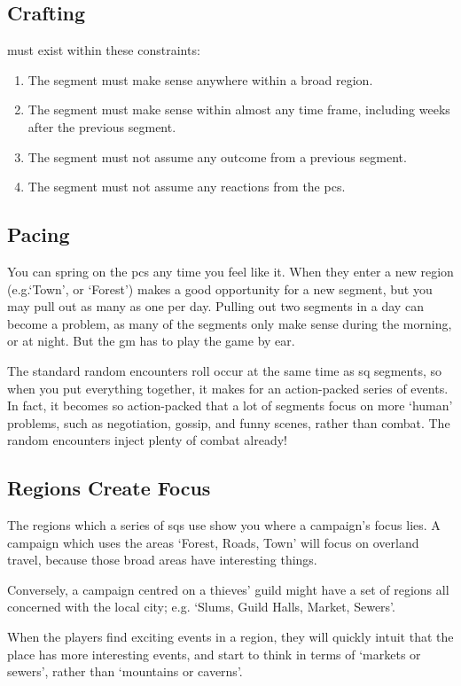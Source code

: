 \begin{multicols}{2}

\subsection{Crafting }

 must exist within these constraints:

\begin{enumerate}
  \item
  The \gls{segment} must make sense anywhere within a broad region.
  \item
  The \gls{segment} must make sense within almost any time frame, including weeks after the previous \gls{segment}.
  \item
  The \gls{segment} must not assume any outcome from a previous \gls{segment}.
  \item
  The \gls{segment} must not assume any reactions from the \glspl{pc}.
\end{enumerate}

\subsection{Pacing}

You can spring  on the \glspl{pc} any time you feel like it.
When they enter a new region (e.g.`Town', or `Forest') makes a good opportunity for a new \gls{segment}, but you may pull out as many as one per day.
Pulling out two \glspl{segment} in a day can become a problem, as many of the \glspl{segment} only make sense during the morning, or at night.
But the \gls{gm} has to play the game by ear.

The standard random encounters roll occur at the same time as \gls{sq} \glspl{segment}, so when you put everything together, it makes for an action-packed series of events.
In fact, it becomes so action-packed that a lot of \glspl{segment} focus on more `human' problems, such as negotiation, gossip, and funny scenes, rather than combat.
The random encounters inject plenty of combat already!

\subsection{Regions Create Focus}

The regions which a series of \glspl{sq} use show you where a campaign's focus lies.
A campaign which uses the areas `Forest, Roads, Town' will focus on overland travel, because those broad areas have interesting things.

Conversely, a campaign centred on a thieves' guild might have a set of regions all concerned with the local city; e.g. `Slums, Guild Halls, Market, Sewers'.

When the players find exciting events in a region, they will quickly intuit that the place has more interesting events, and start to think in terms of `markets or sewers', rather than `mountains or caverns'.

\end{multicols}

